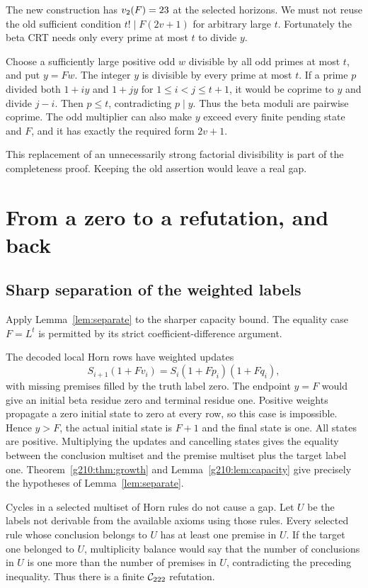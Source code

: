 The new construction has $v_2(F)=23$ at the selected horizons. We must not
reuse the old sufficient condition $t!\mid F(2v+1)$ for arbitrary large $t$.
Fortunately the beta CRT needs only every prime at most $t$ to divide $y$.

Choose a sufficiently large positive odd $w$ divisible by all odd primes at
most $t$, and put $y=Fw$. The integer $y$ is divisible by every prime at
most $t$. If a prime $p$ divided both $1+iy$ and $1+jy$ for
$1\le i<j\le t+1$, it would be coprime to $y$ and divide $j-i$.
Then $p\le t$, contradicting $p\mid y$. Thus the beta moduli are pairwise
coprime. The odd multiplier can also make $y$ exceed every finite pending
state and $F$, and it has exactly the required form $2v+1$.

This replacement of an unnecessarily strong factorial divisibility is part
of the completeness proof. Keeping the old assertion would leave a real gap.

\section{From a zero to a refutation, and back}\label{g210:sec:calibration}

\subsection{Sharp separation of the weighted labels}

Apply Lemma~\ref{lem:separate} to the sharper capacity bound.
The equality case $F=L^t$ is permitted by its strict coefficient-difference
argument.

The decoded local Horn rows have weighted updates
\[
S_{i+1}(1+Fv_i)=S_i(1+Fp_i)(1+Fq_i),
\]
with missing premises filled by the truth label zero. The endpoint $y=F$
would give an initial beta residue zero and terminal residue one. Positive
weights propagate a zero initial state to zero at every row, so this case
is impossible. Hence $y>F$, the actual initial state is $F+1$ and the final
state is one. All states are positive. Multiplying the updates and cancelling
states gives the equality between the conclusion multiset and the premise
multiset plus the target label one. Theorem~\ref{g210:thm:growth} and
Lemma~\ref{g210:lem:capacity} give precisely the hypotheses of
Lemma~\ref{lem:separate}.

Cycles in a selected multiset of Horn rules do not cause a gap. Let $U$ be
the labels not derivable from the available axioms using those rules. Every
selected rule whose conclusion belongs to $U$ has at least one premise in
$U$. If the target one belonged to $U$, multiplicity balance would say
that the number of conclusions in $U$ is one more than the number of
premises in $U$, contradicting the preceding inequality. Thus there is a
finite $\mathcal C_{222}$ refutation.

